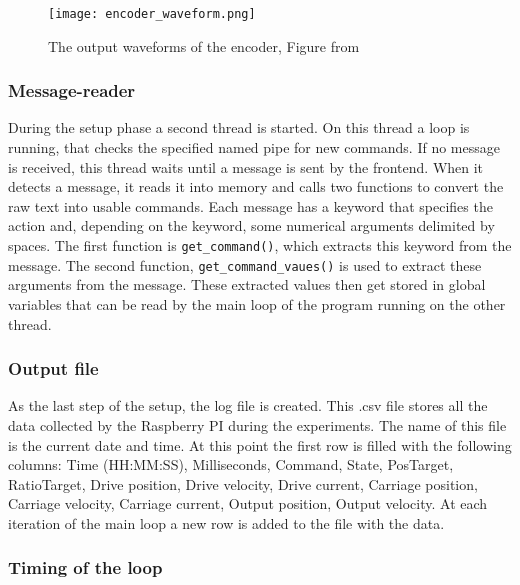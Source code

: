 \documentclass[12pt]{article}
\begin{document}
\begin{figure}[!h]
    \centering
    \texttt{[image: encoder\_waveform.png]}
    \caption{The output waveforms of the encoder, Figure from \cite{encoder}}
    \label{fig:encoder}
\end{figure}



\subsubsection{Message-reader}
During the setup phase a second thread is started. On this thread a loop is running, that checks the specified named pipe for new commands. If no message is received, this thread waits until a message is sent by the frontend. When it detects a message, it reads it into memory and calls two functions to convert the raw text into usable commands. Each message has a keyword that specifies the action and, depending on the keyword, some numerical arguments delimited by spaces. The first function is \verb|get_command()|, which extracts this keyword from the message. The second function, \verb|get_command_vaues()| is used to extract these arguments from the message. These extracted values then get stored in global variables that can be read by the main loop of the program running on the other thread. 


\subsubsection{Output file}
As the last step of the setup, the log file is created. This .csv file stores all the data collected by the Raspberry PI during the experiments. The name of this file is the current date and time. At this point the first row is filled with the following columns: Time (HH:MM:SS), Milliseconds, Command, State, PosTarget, RatioTarget, Drive position, Drive velocity, Drive current, Carriage position, Carriage velocity, Carriage current, Output position, Output velocity. At each iteration of the main loop a new row is added to the file with the data.



\subsubsection{Timing of the loop}
\end{document}
